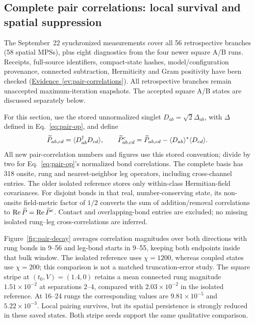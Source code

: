 \documentclass[11pt,letterpaper]{article}
\newcommand{\avg}[1]{\langle #1\rangle}
\newcommand{\ev}[1]{\hyperref[ev:#1]{Evidence~\ref*{ev:#1}}}
\begin{document}
\clearpage
\subsection{Complete pair correlations: local survival and spatial suppression}
\label{sec:pair-correlations}

The September~22 synchronized measurements cover all 56 retrospective
branches (58 spatial MPSs), plus eight diagnostics from the four newer
square A/B runs. Receipts, full-source identifiers, compact-state hashes,
model/configuration provenance, connected subtraction, Hermiticity and
Gram positivity have been checked (\ev{pair-correlations}). All retrospective
branches remain unaccepted maximum-iteration snapshots. The accepted square
A/B states are discussed separately below.

For this section, use the stored unnormalized singlet
$D_{ab}=\sqrt2\Delta_{ab}$, with $\Delta$ defined in
Eq.~\eqref{eq:pair-op}, and define
\begin{equation}
 \widetilde P_{ab,cd}=\avg{D^\dagger_{ab}D_{cd}},\qquad
 \widetilde P^{\rm c}_{ab,cd}=\widetilde P_{ab,cd}
       -\avg{D_{ab}}^*\avg{D_{cd}}.
 \label{eq:connected-pair-measured}
\end{equation}
All new pair-correlation numbers and figures use this stored convention;
divide by two for Eq.~\eqref{eq:pair-op}'s normalized bond correlations.
The complete basis has 318 onsite, rung and nearest-neighbor leg operators,
including cross-channel entries. The older isolated reference stores only
within-class Hermitian-field covariances. For disjoint bonds in that real,
number-conserving state, its non-onsite field-metric factor of $1/2$
converts the sum of addition/removal correlations to
$\operatorname{Re}\widetilde P=\operatorname{Re}\widetilde P^{\rm c}$.
Contact and overlapping-bond entries are excluded; no missing isolated
rung--leg cross-correlations are inferred.

Figure~\ref{fig:pair-decay} averages correlation magnitudes over both
directions with rung bonds in 9--56 and leg-bond starts in 9--55, keeping
both endpoints inside that bulk window. The isolated reference uses
$\chi=1200$, whereas coupled states use $\chi=200$; this comparison is not a
matched truncation-error study. The square stripe at $(t_0,V)=(1.4,0)$
retains a mean connected rung magnitude $1.51\times10^{-2}$ at separations
2--4, compared with $2.03\times10^{-2}$ in the isolated reference. At
16--24 rungs the corresponding values are $9.81\times10^{-5}$ and
$5.22\times10^{-3}$. Local pairing survives, but its spatial persistence
is strongly reduced in these saved states. Both stripe seeds support the
same qualitative comparison.
\end{document}
